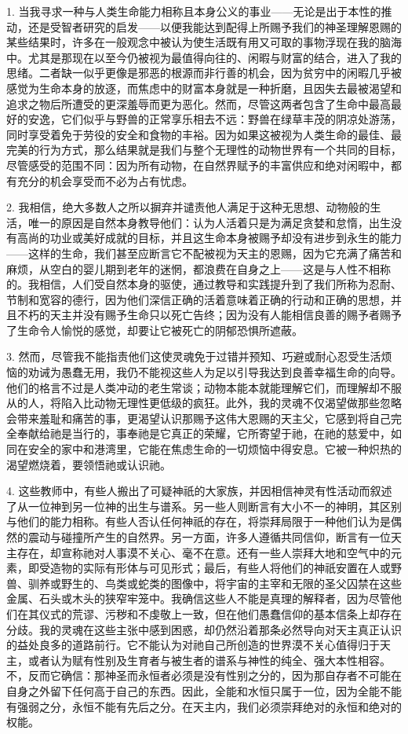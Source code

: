 1. 当我寻求一种与人类生命能力相称且本身公义的事业——无论是出于本性的推动，还是受智者研究的启发——以便我能达到配得上所赐予我们的神圣理解恩赐的某些结果时，许多在一般观念中被认为使生活既有用又可取的事物浮现在我的脑海中。尤其是那现在以至今仍被视为最值得向往的、闲暇与财富的结合，进入了我的思绪。二者缺一似乎更像是邪恶的根源而非行善的机会，因为贫穷中的闲暇几乎被感觉为生命本身的放逐，而焦虑中的财富本身就是一种折磨，且因失去最被渴望和追求之物后所遭受的更深羞辱而更为恶化。然而，尽管这两者包含了生命中最高最好的安逸，它们似乎与野兽的正常享乐相去不远：野兽在绿草丰茂的阴凉处游荡，同时享受着免于劳役的安全和食物的丰裕。因为如果这被视为人类生命的最佳、最完美的行为方式，那么结果就是我们与整个无理性的动物世界有一个共同的目标，尽管感受的范围不同：因为所有动物，在自然界赋予的丰富供应和绝对闲暇中，都有充分的机会享受而不必为占有忧虑。\par

2. 我相信，绝大多数人之所以摒弃并谴责他人满足于这种无思想、动物般的生活，唯一的原因是自然本身教导他们：认为人活着只是为满足贪婪和怠惰，出生没有高尚的功业或美好成就的目标，并且这生命本身被赐予却没有进步到永生的能力——这样的生命，我们甚至应断言它不配被视为天主的恩赐，因为它充满了痛苦和麻烦，从空白的婴儿期到老年的迷惘，都浪费在自身之上——这是与人性不相称的。我相信，人们受自然本身的驱使，通过教导和实践提升到了我们所称为忍耐、节制和宽容的德行，因为他们深信正确的活着意味着正确的行动和正确的思想，并且不朽的天主并没有赐予生命只以死亡告终；因为没有人能相信良善的赐予者赐予了生命令人愉悦的感觉，却要让它被死亡的阴郁恐惧所遮蔽。\par

3. 然而，尽管我不能指责他们这使灵魂免于过错并预知、巧避或耐心忍受生活烦恼的劝诫为愚蠢无用，我仍不能视这些人为足以引导我达到良善幸福生命的向导。他们的格言不过是人类冲动的老生常谈；动物本能本就能理解它们，而理解却不服从的人，将陷入比动物无理性更低级的疯狂。此外，我的灵魂不仅渴望做那些忽略会带来羞耻和痛苦的事，更渴望认识那赐予这伟大恩赐的天主父，它感到将自己完全奉献给祂是当行的，事奉祂是它真正的荣耀，它所寄望于祂，在祂的慈爱中，如同在安全的家中和港湾里，它能在焦虑生命的一切烦恼中得安息。它被一种炽热的渴望燃烧着，要领悟祂或认识祂。\par

4. 这些教师中，有些人搬出了可疑神祇的大家族，并因相信神灵有性活动而叙述了从一位神到另一位神的出生与谱系。另一些人则断言有大小不一的神明，其区别与他们的能力相称。有些人否认任何神祇的存在，将崇拜局限于一种他们认为是偶然的震动与碰撞所产生的自然界。另一方面，许多人遵循共同信仰，断言有一位天主存在，却宣称祂对人事漠不关心、毫不在意。还有一些人崇拜大地和空气中的元素，即受造物的实际有形体与可见形式；最后，有些人将他们的神祇安置在人或野兽、驯养或野生的、鸟类或蛇类的图像中，将宇宙的主宰和无限的圣父囚禁在这些金属、石头或木头的狭窄牢笼中。我确信这些人不能是真理的解释者，因为尽管他们在其仪式的荒谬、污秽和不虔敬上一致，但在他们愚蠢信仰的基本信条上却存在分歧。我的灵魂在这些主张中感到困惑，却仍然沿着那条必然导向对天主真正认识的益处良多的道路前行。它不能认为对祂自己所创造的世界漠不关心值得归于天主，或者认为赋有性别及生育者与被生者的谱系与神性的纯全、强大本性相容。不，反而它确信：那神圣而永恒者必须是没有性别之分的，因为那自存者不可能在自身之外留下任何高于自己的东西。因此，全能和水恒只属于一位，因为全能不能有强弱之分，永恒不能有先后之分。在天主内，我们必须崇拜绝对的永恒和绝对的权能。\par

